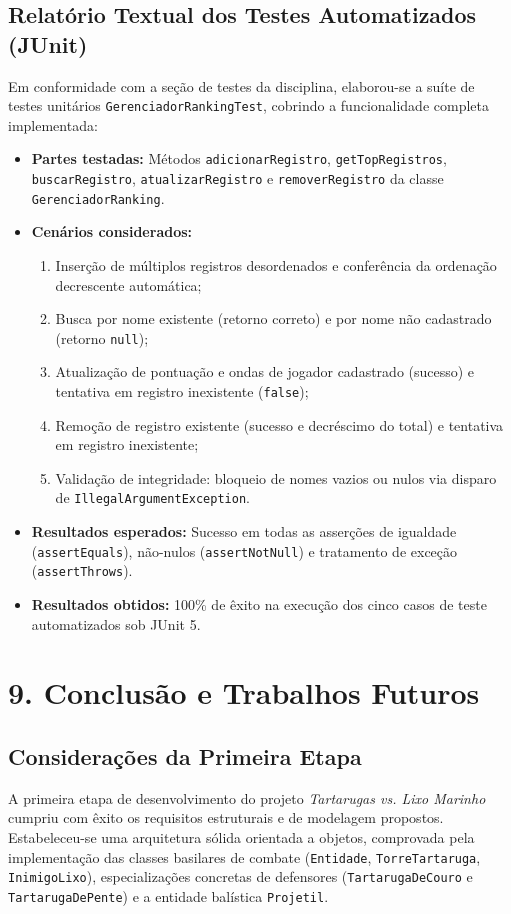 \documentclass[11pt,a4paper]{article}
\begin{document}
\subsection*{Relatório Textual dos Testes Automatizados (JUnit)}
Em conformidade com a seção de testes da disciplina, elaborou-se a suíte de testes unitários \texttt{GerenciadorRankingTest}, cobrindo a funcionalidade completa implementada:
\begin{itemize}
    \item \textbf{Partes testadas:} Métodos \texttt{adicionarRegistro}, \texttt{getTopRegistros}, \texttt{buscarRegistro}, \texttt{atualizarRegistro} e \texttt{removerRegistro} da classe \texttt{GerenciadorRanking}.
    \item \textbf{Cenários considerados:}
    \begin{enumerate}
        \item Inserção de múltiplos registros desordenados e conferência da ordenação decrescente automática;
        \item Busca por nome existente (retorno correto) e por nome não cadastrado (retorno \texttt{null});
        \item Atualização de pontuação e ondas de jogador cadastrado (sucesso) e tentativa em registro inexistente (\texttt{false});
        \item Remoção de registro existente (sucesso e decréscimo do total) e tentativa em registro inexistente;
        \item Validação de integridade: bloqueio de nomes vazios ou nulos via disparo de \texttt{IllegalArgumentException}.
    \end{enumerate}
    \item \textbf{Resultados esperados:} Sucesso em todas as asserções de igualdade (\texttt{assertEquals}), não-nulos (\texttt{assertNotNull}) e tratamento de exceção (\texttt{assertThrows}).
    \item \textbf{Resultados obtidos:} 100\% de êxito na execução dos cinco casos de teste automatizados sob JUnit 5.
\end{itemize}

\clearpage
\section*{9. Conclusão e Trabalhos Futuros}
\subsection*{Considerações da Primeira Etapa}
A primeira etapa de desenvolvimento do projeto \textit{Tartarugas vs. Lixo Marinho} cumpriu com êxito os requisitos estruturais e de modelagem propostos. Estabeleceu-se uma arquitetura sólida orientada a objetos, comprovada pela implementação das classes basilares de combate (\texttt{Entidade}, \texttt{TorreTartaruga}, \texttt{InimigoLixo}), especializações concretas de defensores (\texttt{TartarugaDeCouro} e \texttt{TartarugaDePente}) e a entidade balística \texttt{Projetil}.
\end{document}
